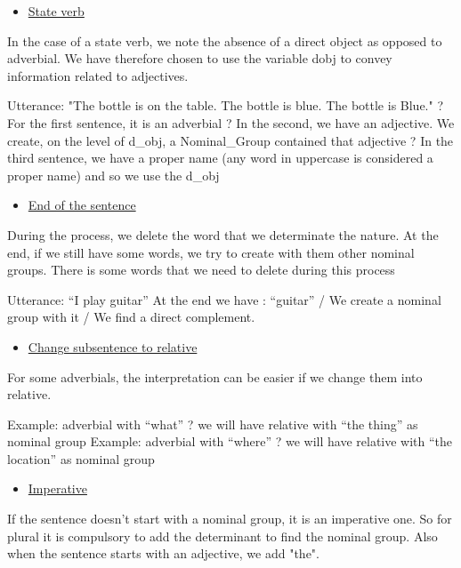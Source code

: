 \documentclass[twoside,a4paper,10pt]{report}
\newcommand{\dokuunderline}[1]{\underline{#1}}
\newcommand{\dokuitem}{\item}
\begin{document}
\begin{itemize}
\dokuitem  \dokuunderline{State verb}
\end{itemize}
In the case of a state verb, we note the absence of a direct object as opposed to adverbial. We have therefore chosen to use the variable d{\textunderscore}obj to convey information related to adjectives.


\small
\begin{verbatimtab}
  Utterance: "The bottle is on the table. The bottle is blue. The bottle is Blue."
  ? For the first sentence, it is an adverbial
  ? In the second, we have an adjective. We create, on the level  of d_obj, a Nominal_Group
contained that adjective
  ? In the third sentence, we have a proper name (any word in uppercase is considered a proper name)
and so we use the d_obj
\end{verbatimtab}
\normalsize

\begin{itemize}
\dokuitem  \dokuunderline{End of the sentence}
\end{itemize}
During the process, we delete the word that we determinate the nature. At the end, if we still have some words, we try to create with them other nominal groups. There is some words that we need to delete during this process


\small
\begin{verbatimtab}
  Utterance: “I play guitar”
  At the end we have : “guitar” / We create a nominal group with it / We find a direct
complement.
\end{verbatimtab}
\normalsize

\begin{itemize}
\dokuitem  \dokuunderline{Change subsentence to relative}
\end{itemize}
For some adverbials, the interpretation can be easier if we change them into relative.


\small
\begin{verbatimtab}
  Example: adverbial with “what” ? we will have relative with “the thing” as nominal group
  Example: adverbial with “where” ? we will have relative with “the location” as nominal
group
\end{verbatimtab}
\normalsize

\begin{itemize}
\dokuitem  \dokuunderline{Imperative}
\end{itemize}
If the sentence doesn’t start with a nominal group, it is an imperative one. So for plural it is compulsory to add the determinant to find the nominal group. Also when the sentence starts with an adjective, we add "the".
\end{document}
